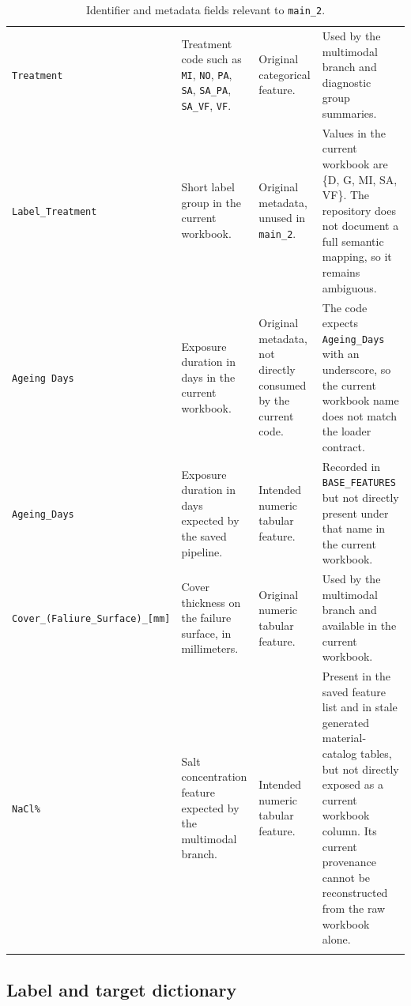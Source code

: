 \documentclass[11pt]{article}
\begin{document}
\begin{longtable}{p{} p{} p{} p{}}
\texttt{Treatment} & Treatment code such as \texttt{MI}, \texttt{NO}, \texttt{PA}, \texttt{SA}, \texttt{SA\_PA}, \texttt{SA\_VF}, \texttt{VF}. & Original categorical feature. & Used by the multimodal branch and diagnostic group summaries. \\
\texttt{Label\_Treatment} & Short label group in the current workbook. & Original metadata, unused in \texttt{main\_2}. & Values in the current workbook are \{D, G, MI, SA, VF\}. The repository does not document a full semantic mapping, so it remains ambiguous. \\
\texttt{Ageing Days} & Exposure duration in days in the current workbook. & Original metadata, not directly consumed by the current code. & The code expects \texttt{Ageing\_Days} with an underscore, so the current workbook name does not match the loader contract. \\
\texttt{Ageing\_Days} & Exposure duration in days expected by the saved pipeline. & Intended numeric tabular feature. & Recorded in \texttt{BASE\_FEATURES} but not directly present under that name in the current workbook. \\
\texttt{Cover\_(Faliure\_Surface)\_[mm]} & Cover thickness on the failure surface, in millimeters. & Original numeric tabular feature. & Used by the multimodal branch and available in the current workbook. \\
\texttt{NaCl\%} & Salt concentration feature expected by the multimodal branch. & Intended numeric tabular feature. & Present in the saved feature list and in stale generated material-catalog tables, but not directly exposed as a current workbook column. Its current provenance cannot be reconstructed from the raw workbook alone. \\
\bottomrule
\caption{Identifier and metadata fields relevant to \texttt{main\_2}.}
\label{tab:metadata_dictionary}
\end{longtable}

\subsection{Label and target dictionary}
\end{document}
